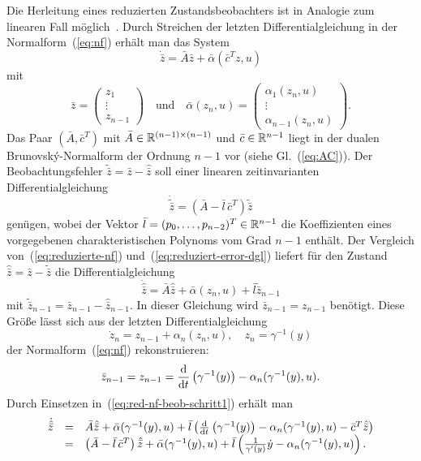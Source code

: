 Die Herleitung eines reduzierten Zustandsbeobachters ist in Analogie
zum linearen Fall möglich~\cite[Abschnitt~{7.4.2}]{ludyk1995-2}.
Durch Streichen der letzten Differentialgleichung in der Normalform~(\ref{eq:nf})
erhält man das System 
\begin{equation}
\dot{\bar{z}}=\bar{A}\bar{z}+\bar{\alpha}(\bar{c}^{T}z,u)\label{eq:reduzierte-nf}
\end{equation}
mit 
\[
\bar{z}=\left(\begin{array}{c}
z_{1}\\
\vdots\\
z_{n-1}
\end{array}\right)\quad\mbox{und}\quad\bar{\alpha}(z_{n},u)=\left(\begin{array}{c}
\alpha_{1}(z_{n},u)\\
\vdots\\
\alpha_{n-1}(z_{n},u)
\end{array}\right).
\]
Das Paar $(\bar{A},\bar{c}^{T})$ mit $\bar{A}\in{\mathbb{R}}^{(n-1)\times(n-1)}$
und $\bar{c}\in{\mathbb{R}}^{n-1}$ liegt in der dualen Brunovský-Normalform
der Ordnung $n-1$ vor (siehe Gl.~(\ref{eq:AC})). Der Beobachtungsfehler
$\tilde{\bar{z}}=\bar{z}-\hat{\bar{z}}$ soll einer linearen zeit\-invarianten
Differentialgleichung 
\begin{equation}
\dot{\tilde{\bar{z}}}=\left(\bar{A}-\bar{l}\,\bar{c}^{T}\right)\tilde{\bar{z}}\label{eq:reduziert-error-dgl}
\end{equation}
genügen, wobei der Vektor $\bar{l}=(p_{0},\ldots,p_{n-2})^{T}\in{\mathbb{R}}^{n-1}$
die Koeffizienten eines vorgegebenen charakteristischen Polynoms vom
Grad $n-1$ enthält. Der Vergleich von~(\ref{eq:reduzierte-nf})
und~(\ref{eq:reduziert-error-dgl}) liefert für den Zustand $\hat{\bar{z}}=\bar{z}-\tilde{\bar{z}}$
die Differentialgleichung
\begin{equation}
\dot{\hat{\bar{z}}}=\bar{A}\hat{\bar{z}}+\bar{\alpha}(z_{n},u)+\bar{l}\tilde{\bar{z}}_{n-1}\label{eq:red-nf-beob-schritt1}
\end{equation}
mit $\tilde{\bar{z}}_{n-1}=\bar{z}_{n-1}-\hat{\bar{z}}_{n-1}$. In
dieser Gleichung wird $\bar{z}_{n-1}=z_{n-1}$ benötigt. Diese Größe
lässt sich aus der letzten Differentialgleichung 
\[
\dot{z}_{n}=z_{n-1}+\alpha_{n}(z_{n},u),\quad z_{n}=\gamma^{-1}(y)
\]
der Normalform~(\ref{eq:nf}) rekonstruieren: 
\[
\bar{z}_{n-1}=z_{n-1}=\frac{{\mathrm{d}}}{{\mathrm{d}} t}\left(\gamma^{-1}(y)\right)-\alpha_{n}(\gamma^{-1}(y),u).
\]
Durch Einsetzen in~(\ref{eq:red-nf-beob-schritt1}) erhält man 
\[
\begin{array}{ccl}
\dot{\hat{\bar{z}}} & = & \bar{A}\hat{\bar{z}}+\bar{\alpha}(\gamma^{-1}(y),u)+\bar{l}\left(\frac{{\mathrm{d}}}{{\mathrm{d}} t}\left(\gamma^{-1}(y)\right)-\alpha_{n}(\gamma^{-1}(y),u)-\bar{c}^{T}\hat{\bar{z}}\right)\\
 & = & \left(\bar{A}-\bar{l}\,\bar{c}^{T}\right)\hat{\bar{z}}+\bar{\alpha}(\gamma^{-1}(y),u)+\bar{l}\left(\frac{1}{\gamma^{\prime}(y)}\dot{y}-\alpha_{n}(\gamma^{-1}(y),u)\right).
\end{array}
\]
